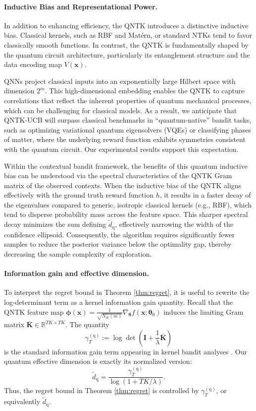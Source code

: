 \documentclass[pdflatex,sn-mathphys-num]{sn-jnl}%
\theoremstyle{thmstyleone}%
\theoremstyle{thmstyletwo}%
\theoremstyle{thmstylethree}%
\newcommand{\xbf}{\mathbf{x}}
\newcommand{\Kbf}{\mathbf{K}}
\newcommand{\Ibf}{\mathbf{I}}
\newcommand{\phibf}{\bm{\phi}}
\begin{document}
\paragraph{Inductive Bias and Representational Power.}
In addition to enhancing efficiency, the QNTK  introduces a distinctive inductive bias. Classical kernels, such as RBF and Mat\'ern, or standard NTKs tend to favor classically smooth functions. In contrast, the QNTK is fundamentally shaped by the quantum circuit architecture, particularly its entanglement structure and the data encoding map $V(\xbf)$. 

QNNs project classical inputs into an exponentially large Hilbert space with dimension $2^m$. This high-dimensional embedding enables the QNTK to capture correlations that reflect the inherent properties of quantum mechanical processes, which can be challenging for classical models. As a result, we anticipate that QNTK-UCB will surpass classical benchmarks in ``quantum-native'' bandit tasks, such as optimizing variational quantum eigensolvers (VQEs) or classifying phases of matter, where the underlying reward function exhibits symmetries consistent with the quantum circuit. Our experimental results support this expectation.%

Within the contextual bandit framework, the benefits of this quantum inductive bias can be understood via the spectral characteristics of the QNTK Gram matrix of the observed contexts. When the inductive bias of the QNTK aligns effectively with the ground truth reward function $h$, it results in a faster decay   of the eigenvalues compared to generic, isotropic classical kernels (e.g., RBF), which tend to disperse probability mass across the feature space. This sharper spectral decay minimizes the sum defining $\widetilde{d}_{\mathrm{q}}$, effectively narrowing the width of the confidence ellipsoid. Consequently, the algorithm requires significantly fewer samples to reduce the posterior variance below the optimality gap, thereby decreasing the sample complexity of exploration. %


\paragraph{Information gain and effective dimension.}

To interpret the regret bound in Theorem \ref{thm:regret}, it is useful to rewrite the log-determinant term as a kernel information gain quantity. Recall that the QNTK feature map $\phibf(\xbf) = \frac{1}{\sqrt{N_K(m)}} \nabla_{\bm{\theta}} f(\xbf;\bm{\theta}_0)$ induces the limiting Gram matrix $\bar{\Kbf} \in \mathbb{R}^{TK \times TK}$. The quantity $$\gamma_T^{(\mathrm{q})} := \log \det \left( \Ibf + \frac{1}{\lambda} \bar{\Kbf} \right)$$
is the standard information gain term appearing in kernel bandit analyses \cite{Srinivas_2012}. Our quantum effective dimension is exactly its normalized version: $$\widetilde{d}_{\mathrm{q}} = \frac{\gamma_T^{(\mathrm{q})}}{\log(1 + TK/\lambda)}.$$
Thus, the regret bound in Theorem \ref{thm:regret} is controlled by $\gamma_T^{( \mathrm{q})}$, or equivalently $\widetilde{d}_{\mathrm{q}}$.
\end{document}

